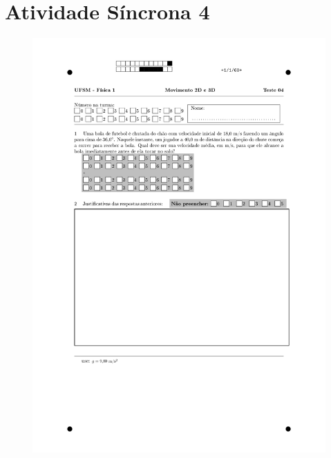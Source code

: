 \section{Atividade Síncrona 4} \label{ch:orp1e4}
\vspace*{\fill}
\begin{figure}[H]\centering
\includegraphics[scale=0.7]{fig/orp1q3_page-0001.jpg}
\end{figure}
\vspace*{\fill}
